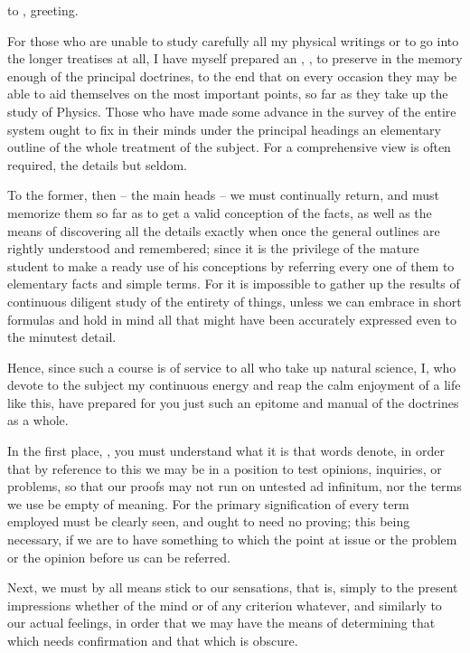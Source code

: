 \documentclass{stex}
\begin{document}

\noindent {} to , greeting.

For those who are unable to study carefully all my physical writings or to go into the longer treatises at all, I have myself prepared an , , to preserve in the memory enough of the principal doctrines, to the end that on every occasion they may be able to aid themselves on the most important points, so far as they take up the study of Physics.
Those who have made some advance in the survey of the entire system ought to fix in their minds under the principal headings an elementary outline of the whole treatment of the subject.
For a comprehensive view is often required, the details but seldom.

To the former, then – the main heads – we must continually return, and must memorize them so far as to get a valid conception of the facts, as well as the means of discovering all the details exactly when once the general outlines are rightly understood and remembered; since it is the privilege of the mature student to make a ready use of his conceptions by referring every one of them to elementary facts and simple terms.
For it is impossible to gather up the results of continuous diligent study of the entirety of things, unless we can embrace in short formulas and hold in mind all that might have been accurately expressed even to the minutest detail.

Hence, since such a course is of service to all who take up natural science, I, who devote to the subject my continuous energy and reap the calm enjoyment of a life like this, have prepared for you just such an epitome and manual of the doctrines as a whole.

In the first place, , you must understand what it is that words denote, in order that by reference to this we may be in a position to test opinions, inquiries, or problems, so that our proofs may not run on untested \foreignlanguage{latin}{ad infinitum}, nor the terms we use be empty of meaning.
For the primary signification of every term employed must be clearly seen, and ought to need no proving; this being necessary, if we are to have something to which the point at issue or the problem or the opinion before us can be referred.

Next, we must by all means stick to our sensations, that is, simply to the present impressions whether of the mind or of any criterion whatever, and similarly to our actual feelings, in order that we may have the means of determining that which needs confirmation and that which is obscure.
\end{document}
